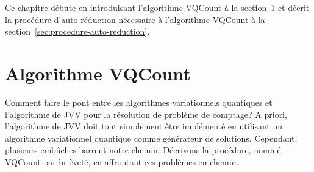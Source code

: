 Ce chapitre débute en introduisant l'algorithme VQCount à la section~\ref{sec:algorithme-vqcount} et décrit la procédure d'auto-réduction nécessaire à l'algorithme VQCount à la section~\ref{sec:procedure-auto-reduction}.


\section{Algorithme VQCount}
\label{sec:algorithme-vqcount}

Comment faire le pont entre les algorithmes variationnels quantiques et l'algorithme de JVV pour la résolution de problème de comptage? A priori, l'algorithme de JVV doit tout simplement être implémenté en utilisant un algorithme variationnel quantique comme générateur de solutions. Cependant, plusieurs embûches barrent notre chemin. Décrivons la procédure, nommé VQCount par brièveté, en affrontant ces problèmes en chemin.

